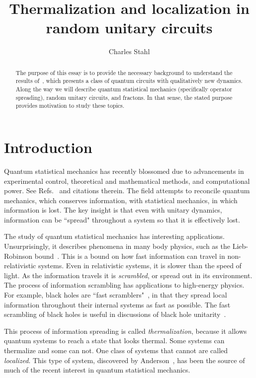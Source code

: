 \documentclass[a4paper,11pt]{article}
\title{Thermalization and localization in random unitary circuits}
\author{Charles Stahl}
\begin{document}
\maketitle

\begin{abstract}

The purpose of this essay is to provide the necessary background to understand the results of~\cite{PaiFracton}, which presents a class of quantum circuits with qualitatively new dynamics. Along the way we will describe quantum statistical mechanics (specifically operator spreading), random unitary circuits, and fractons. In that sense, the stated purpose provides motivation to study these topics.

\end{abstract}

\section{Introduction} \label{sec:intro}

Quantum statistical mechanics has recently blossomed due to advancements in experimental control, theoretical and mathematical methods, and computational power. See Refs.~\cite{GogolinStatMech, PolkovnikovClosed} and citations therein. The field attempts to reconcile quantum mechanics, which conserves information, with statistical mechanics, in which information is lost. The key insight is that even with unitary dynamics, information can be ``spread" throughout a system so that it is effectively lost.

The study of quantum statistical mechanics has interesting applications. Unsurprisingly, it describes phenomena in many body physics, such as the Lieb-Robinson bound~\cite{Lieb72, RobertsSwingle}. This is a bound on how fast information can travel in non-relativistic systems. Even in relativistic systems, it is slower than the speed of light. As the information travels it is \emph{scrambled}, or spread out in its environment. The process of information scrambling has applications to high-energy physics. For example, black holes are ``fast scramblers"~\cite{SekinoSusskind}, in that they spread local information throughout their internal systems as fast as possible. The fast scrambling of black holes is useful in discussions of black hole unitarity~\cite{HaydenPreskill}.

This process of information spreading is called \emph{thermalization}, because it allows quantum systems to reach a state that looks thermal. Some systems can thermalize and some can not. One class of systems that cannot are called \emph{localized}. This type of system, discovered by Anderson~\cite{AndersonDiff}, has been the source of much of the recent interest in quantum statistical mechanics.
\end{document}
